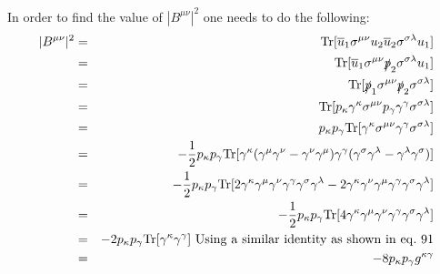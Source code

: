 \documentclass[12pt]{article}
\def \bea{\begin{eqnarray}}
\def \eea{\end{eqnarray}}
\def \Tr{{\rm Tr}}
\def \ou{\overline{u}}
\def \ga{\gamma}
\def \ka{\kappa}
\def \la{\lambda}
\def \si{\sigma}
\def \cre{\color{red}}
\begin{document}
\begin{enumerate}
In order to find the value of $|B^{\mu\nu}|^2$ one needs to do the following:
{\cre
\bea
|B^{\mu\nu}|^2 &=& \Tr[\ou_1 \si^{\mu\nu} u_2\ou_2 \si^{\si\la}u_1]\\
&=& \Tr[\ou_1 \si^{\mu\nu}\slashed{p}_2 \si^{\si\la} u_1]\\
&=& \Tr[\slashed{p}_1\si^{\mu\nu}\slashed{p}_2 \si^{\si\la}]\\
&=& \Tr[p_\ka \ga^\ka \si^{\mu\nu}p_\ga \ga^\ga \si^{\si\la}]\\
&=& p_\ka p_\ga \Tr[\ga^\ka \si^{\mu\nu}\ga^\ga \si^{\si\la}]\\
&=& -\frac{1}{2} p_\ka p_\ga \Tr[\ga^\ka (\ga^\mu \ga^\nu - \ga^\nu \ga^\mu) \ga^\ga (\ga^\si \ga^\la - \ga^\la \ga^\si)]\\
&=& -\frac{1}{2} p_\ka p_\ga \Tr[2\ga^\ka \ga^\mu \ga^\nu \ga^\ga \ga^\si \ga^\la  - 2\ga^\ka \ga^\nu \ga^\mu \ga^\ga \ga^\si \ga^\la]\\
&=& -\frac{1}{2} p_\ka p_\ga \Tr[4\ga^\ka \ga^\mu \ga^\nu \ga^\ga \ga^\si \ga^\la]\\
&=& -2p_\ka p_\ga \Tr[\ga^\ka \ga^\ga]~{\rm Using~ a~ similar~ identity~ as~ shown~ in~ eq.~ 91}\\
&=& -8p_\ka p_\ga g^{\ka\ga}
\eea
}
\end{enumerate}
\end{document}
